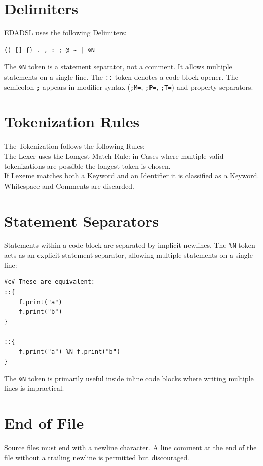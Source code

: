 \section{Delimiters}
EDADSL uses the following Delimiters:
\begin{verbatim}
() [] {} . , : ; @ ~ | %N
\end{verbatim}

The \texttt{\%N} token is a statement separator, not a comment. It allows multiple statements on a single line. The \texttt{::} token denotes a code block opener. The semicolon \texttt{;} appears in modifier syntax (\texttt{;M=}, \texttt{;P=}, \texttt{;T=}) and property separators.

\section{Tokenization Rules}
The Tokenization follows the following Rules: \\
The Lexer uses the Longest Match Rule: in Cases where multiple valid tokenizations are possible the longest token is chosen. \\
If Lexeme matches both a Keyword and an Identifier it is classified as a Keyword. \\
Whitespace and Comments are discarded.

\section{Statement Separators}
Statements within a code block are separated by implicit newlines. The \texttt{\%N} token acts as an explicit statement separator, allowing multiple statements on a single line:
\begin{verbatim}
#c# These are equivalent:
::{
    f.print("a")
    f.print("b")
}

::{
    f.print("a") %N f.print("b")
}
\end{verbatim}
The \texttt{\%N} token is primarily useful inside inline code blocks where writing multiple lines is impractical.

\section{End of File}
Source files must end with a newline character. A line comment at the end of the file without a trailing newline is permitted but discouraged.

